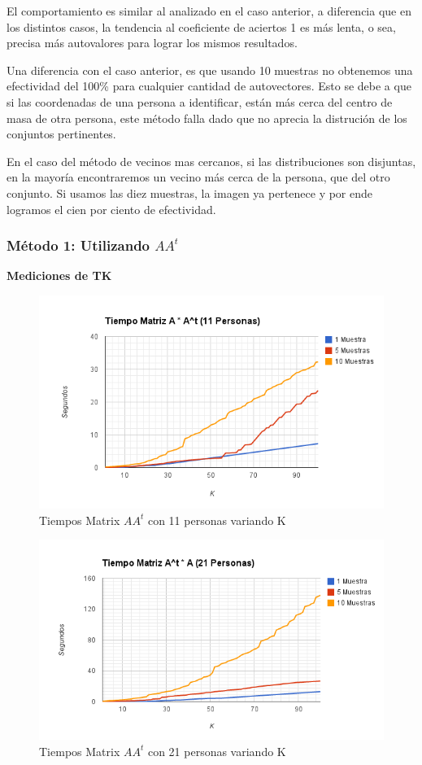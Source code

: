 El comportamiento es similar al analizado en el caso anterior, a diferencia que en los distintos
casos, la tendencia al coeficiente de aciertos 1 es m\'as lenta, o sea, precisa m\'as autovalores
para lograr los mismos resultados.

Una diferencia con el caso anterior, es que usando 10 muestras no obtenemos una efectividad del
100\% para cualquier cantidad de autovectores. Esto se debe a que si las coordenadas de una persona
a identificar, est\'an m\'as cerca del centro de masa de otra persona, este m\'etodo falla dado que
no aprecia la distruci\'on de los conjuntos pertinentes.

En el caso del m\'etodo de vecinos mas cercanos, si las distribuciones son disjuntas, en la mayor\'ia
encontraremos un vecino m\'as cerca de la persona, que del otro conjunto. Si usamos las diez muestras, la imagen ya
pertenece y por ende logramos el cien por ciento de efectividad.


\subsubsection{M\'etodo 1: Utilizando $AA^t$}

\textbf{Mediciones de TK }

\begin{figure}[H] \includegraphics[width=1\textwidth]{img/imagea.png} \caption{Tiempos Matrix $AA^t$
    con 11 personas variando K} \end{figure}

\begin{figure}[H] \includegraphics[width=1\textwidth]{img/imageb.png} \caption{Tiempos Matrix $AA^t$
    con 21 personas variando K} \end{figure}

